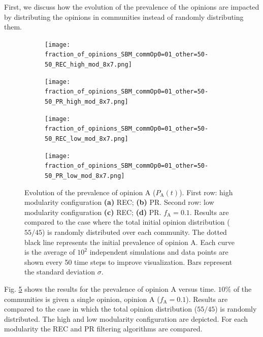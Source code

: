 \documentclass[11 pt , letterpaper , twoside , openright]{book}
\begin{document}
First, we discuss how the evolution of the prevalence of the opinions are impacted by distributing the opinions in communities instead of randomly distributing them.

\begin{figure}[H]
  \begin{subfigure}[b]{0.49\textwidth}
    \caption{}
  	\texttt{[image: fraction\_of\_opinions\_SBM\_commOp0=01\_other=50-50\_REC\_high\_mod\_8x7.png]}
    \label{high_mod_rec}
  \end{subfigure}
  \begin{subfigure}[b]{0.49\textwidth}
    \caption{}
  	\texttt{[image: fraction\_of\_opinions\_SBM\_commOp0=01\_other=50-50\_PR\_high\_mod\_8x7.png]}
    \label{high_mod_pr}
  \end{subfigure}
  \begin{subfigure}[b]{0.49\textwidth}
   \caption{}
    \texttt{[image: fraction\_of\_opinions\_SBM\_commOp0=01\_other=50-50\_REC\_low\_mod\_8x7.png]}
    \label{low_mod_rec}
  \end{subfigure}
  \begin{subfigure}[b]{0.49\textwidth}
    \caption{}
    \texttt{[image: fraction\_of\_opinions\_SBM\_commOp0=01\_other=50-50\_PR\_low\_mod\_8x7.png]}
    \label{low_mod_pr}
  \end{subfigure}
  \captionsetup{format=plain}
  \caption[Evolution of the prevalence of opinion A ($P_\text{A}(t)$). $10 \%$ of the communities is given a single opinion, opinion A, while the others get an initial $50/50$ opinion distribution. Results are compared to the case where the total initial opinion distribution ($55/45$) is randomly distributed over each community.]{Evolution of the prevalence of opinion A ($P_\text{A}(t)$). First row: high modularity configuration \textbf{(a)} REC; \textbf{(b)} PR. Second row: low modularity configuration \textbf{(c)} REC; \textbf{(d)} PR. $f_\text{A} = 0.1$. Results are compared to the case where the total initial opinion distribution ($55/45$) is randomly distributed over each community. The dotted black line represents the initial prevalence of opinion A. Each curve is the average of $10^2$ independent simulations and data points are shown every 50 time steps to improve visualization. Bars represent the standard deviation $\sigma$.}
\label{commOp0_01_other_50-50}
\end{figure}
\newpage
\noindent
Fig. \ref{commOp0_01_other_50-50} shows the results for the prevalence of opinion A versus time. $10 \%$ of the communities is given a single opinion, opinion A ($f_\text{A} = 0.1$). Results are compared to the case in which the total opinion distribution ($55/45$) is randomly distributed. The high and low modularity configuration are depicted. For each modularity the REC and PR filtering algorithms are compared.\\
\end{document}
